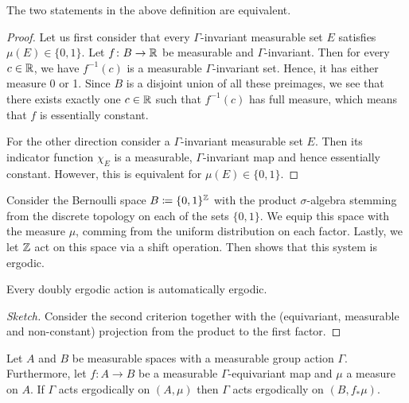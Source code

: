 \begin{lemma}
  The two statements in the above definition are equivalent.
\end{lemma}

\begin{proof}
  Let us first consider that every \(\Gamma\)-invariant measurable set \(E\) satisfies \(\mu(E) \in \{0,1\}\). Let \(f \colon B \to \mathbb{R}\) be measurable and \(\Gamma\)-invariant. Then for every \(c \in \mathbb{R}\), we have \(f^{-1}(c)\) is a measurable \(\Gamma\)-invariant set. Hence, it has either measure 0 or 1. Since \(B\) is a disjoint union of all these preimages, we see that there exists exactly one \(c \in \mathbb{R}\) such that \(f^{-1}(c)\) has full measure, which means that \(f\) is essentially constant.

  For the other direction consider a \(\Gamma\)-invariant measurable set \(E\). Then its indicator function \(\chi_E\) is a measurable, \(\Gamma\)-invariant map and hence essentially constant. However, this is equivalent for \(\mu(E) \in \{0,1\}\).
\end{proof}

\begin{bsp}
  Consider the Bernoulli space \(B \coloneqq \{0,1\}^{\mathbb{Z}}\) with the product \(\sigma\)-algebra stemming from the discrete topology on each of the sets \(\{0,1\}\). We equip this space with the measure \(\mu\), comming from the uniform distribution on each factor. Lastly, we let \(\mathbb{Z}\) act on this space via a shift operation. Then \textcite[Example 20.26]{Klenke} shows that this system is ergodic.
\end{bsp}

\begin{prop}
  \label{prop:coeff-ergodic}
  Every doubly ergodic action is automatically ergodic.
\end{prop}

\begin{proof}[Sketch]
  Consider the second criterion together with the (equivariant, measurable and non-constant) projection from the product to the first factor.
\end{proof}

\begin{lemma}
  \label{lemma:ergodicity-pushforward}
  Let \(A\) and \(B\) be measurable spaces with a measurable group action \(\Gamma\). Furthermore, let \(f\colon A \to B\) be a measurable \(\Gamma\)-equivariant map and \(\mu\) a measure on \(A\). If \(\Gamma\) acts ergodically on \((A, \mu)\) then \(\Gamma\) acts ergodically on \((B, f_\ast \mu)\).
\end{lemma}


